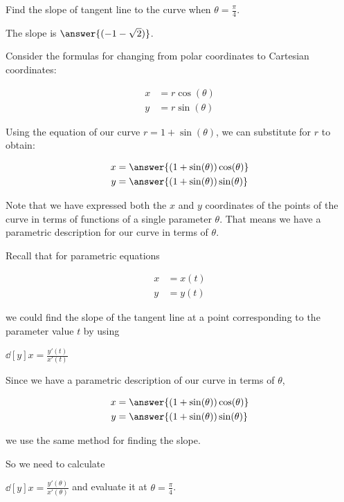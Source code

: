 \documentclass{ximera}
\begin{document}
\begin{exercise}
\begin{hint}
\end{hint}

\begin{exercise}

Find the slope of tangent line to the curve when $\theta=\frac{\pi}{4}$. 

The slope is $\answer{ ( -1-\sqrt{2} )  }$.

\begin{hint}

Consider the formulas for changing from polar coordinates to Cartesian coordinates:

\begin{align*}
x&=r\cos(\theta) \\
y&=r\sin(\theta)
\end{align*}

Using the equation of our curve $r=1+\sin(\theta)$, we can substitute for $r$ to obtain:

\begin{align*}
x&=\answer{(1+\sin(\theta))\cos(\theta)} \\
y&=\answer{(1+\sin(\theta))\sin(\theta) }
\end{align*}

Note that we have expressed both the $x$ and $y$ coordinates of the points of the curve in terms of functions of a single parameter $\theta$. That means we have a parametric description for our curve in terms of $\theta$. 

Recall that for parametric equations 

\begin{align*}
x&=x(t) \\
y&=y(t)
\end{align*}

we could find the slope of the tangent line at a point corresponding to the parameter value $t$ by using 

$\dd[y]{x}=\frac{ y'(t)}{x'(t)}$


Since we have a parametric description of our curve in terms of $\theta$, 

\begin{align*}
x&=\answer{(1+\sin(\theta))\cos(\theta)} \\
y&=\answer{(1+\sin(\theta))\sin(\theta) }
\end{align*}

we use the same method for finding the slope. 

So we need to calculate

$\dd[y]{x}=\frac{ y'(\theta)}{x'(\theta)}$ and evaluate it at $\theta=\frac{\pi}{4}$. 


\end{hint}
\end{exercise}
\end{exercise}
\end{document}

